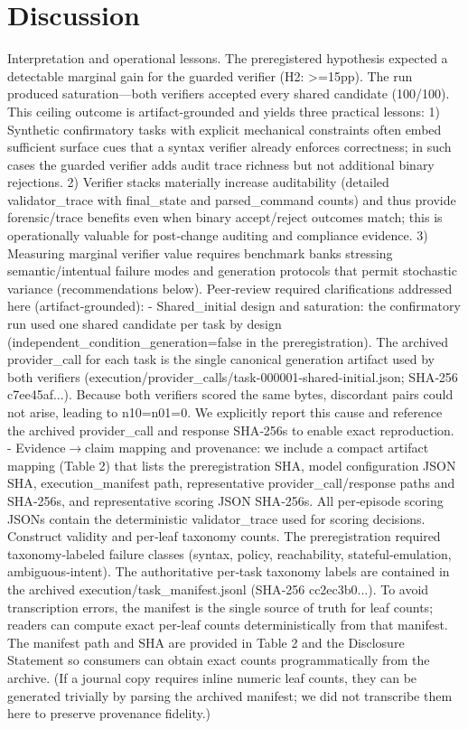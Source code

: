 \documentclass[conference]{IEEEtran}
\begin{document}
\section{Discussion}
Interpretation and operational lessons. The preregistered hypothesis expected a detectable marginal gain for the guarded verifier (H2: >=15pp). The run produced saturation---both verifiers accepted every shared candidate (100/100). This ceiling outcome is artifact‑grounded and yields three practical lessons:
1) Synthetic confirmatory tasks with explicit mechanical constraints often embed sufficient surface cues that a syntax verifier already enforces correctness; in such cases the guarded verifier adds audit trace richness but not additional binary rejections.
2) Verifier stacks materially increase auditability (detailed validator\_trace with final\_state and parsed\_command counts) and thus provide forensic/trace benefits even when binary accept/reject outcomes match; this is operationally valuable for post‑change auditing and compliance evidence.
3) Measuring marginal verifier value requires benchmark banks stressing semantic/intentual failure modes and generation protocols that permit stochastic variance (recommendations below).
Peer‑review required clarifications addressed here (artifact‑grounded):
- Shared\_initial design and saturation: the confirmatory run used one shared candidate per task by design (independent\_condition\_generation=false in the preregistration). The archived provider\_call for each task is the single canonical generation artifact used by both verifiers (execution/provider\_calls/task-000001-shared-initial.json; SHA‑256 c7ee45af...). Because both verifiers scored the same bytes, discordant pairs could not arise, leading to n10=n01=0. We explicitly report this cause and reference the archived provider\_call and response SHA‑256s to enable exact reproduction.
- Evidence\ensuremath{\rightarrow}claim mapping and provenance: we include a compact artifact mapping (Table 2) that lists the preregistration SHA, model configuration JSON SHA, execution\_manifest path, representative provider\_call/response paths and SHA‑256s, and representative scoring JSON SHA‑256s. All per‑episode scoring JSONs contain the deterministic validator\_trace used for scoring decisions.
Construct validity and per‑leaf taxonomy counts. The preregistration required taxonomy‑labeled failure classes (syntax, policy, reachability, stateful‑emulation, ambiguous‑intent). The authoritative per‑task taxonomy labels are contained in the archived execution/task\_manifest.jsonl (SHA‑256 cc2ec3b0...). To avoid transcription errors, the manifest is the single source of truth for leaf counts; readers can compute exact per‑leaf counts deterministically from that manifest. The manifest path and SHA are provided in Table 2 and the Disclosure Statement so consumers can obtain exact counts programmatically from the archive. (If a journal copy requires inline numeric leaf counts, they can be generated trivially by parsing the archived manifest; we did not transcribe them here to preserve provenance fidelity.)
\end{document}
